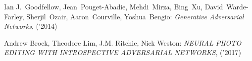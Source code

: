 \documentclass[10pt]{article}
\begin{document}
\newpage
\begin{thebibliography}{99} %
   Ian J.~Goodfellow, Jean~Pouget-Abadie, Mehdi~Mirza, Bing~Xu, David~Warde-Farley, Sherjil~Ozair, Aaron~Courville, Yoshua~Bengio:
    \emph{Generative Adversarial Networks}, ('2014)

     Andrew Brock, Theodore Lim, J.M. Ritchie,
    Nick Weston:
      \emph{NEURAL PHOTO EDITING WITH INTROSPECTIVE ADVERSARIAL NETWORKS}, ('2017)

\end{thebibliography}


\end{document}

